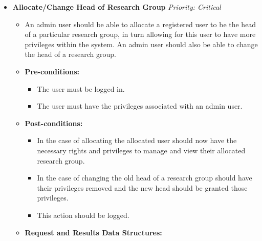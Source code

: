 \documentclass{article}
\begin{document}
\begin{itemize}
					\item \textbf{Allocate/Change Head of Research Group} \hfill \textit{Priority: Critical}
					\begin{itemize}
						\item An admin user should be able to allocate a registered user to be the head of a particular research group, in turn allowing for this user to have more privileges within the system. An admin user should also be able to change the head of a research group.
						\item \textbf{Pre-conditions:}
						\begin{itemize}
							\item The user must be logged in.
							\item The user must have the privileges associated with an admin user.
						\end{itemize}
						\item \textbf{Post-conditions:}
						\begin{itemize}
							\item In the case of allocating the allocated user should now have the necessary rights and privileges to manage and view their allocated research group.
							\item In the case of changing the old head of a research group should have their privileges removed and the new head should be granted those privileges.
							\item This action should be logged.
						\end{itemize}
						\item \textbf{Request and Results Data Structures:}
					\end{itemize}
				\end{itemize}
\end{document}
